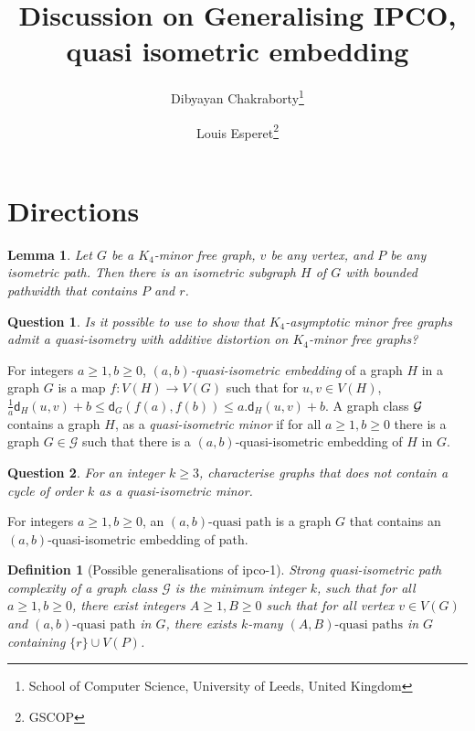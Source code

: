 \documentclass[a4paper]{article}
\title{Discussion on Generalising IPCO, quasi isometric embedding}
\author{Dibyayan Chakraborty\footnote{School of Computer Science, University of Leeds, United Kingdom}
 \and Louis Esperet\footnote{GSCOP}}
\date{}
\newcommand{\distG}[3]{\mathsf{d}_{#1}\left(#2,#3\right)}
\newtheorem{Question}{Question}
\newtheorem{lemma}{Lemma}
\newtheorem{definition}{Definition}
\begin{document}
\maketitle

\section{Directions}
 
 \newcommand{\quasipath}[2]{(#1,#2)\text{-quasi path}\xspace}
  \newcommand{\quasipaths}[2]{(#1,#2)\text{-quasi paths}\xspace}
  
 \begin{lemma}\label{lem:series-parallel}
 	Let $G$ be a $K_4$-minor free graph, $v$ be any vertex, and $P$ be any isometric path. Then there is an isometric subgraph $H$ of $G$ with bounded pathwidth that contains $P$ and $r$.
 \end{lemma}
 
 \begin{Question}
 	Is it possible to use  to show that $K_4$-asymptotic minor free graphs admit a quasi-isometry with additive distortion on $K_4$-minor free graphs?
 \end{Question}
 
 For integers $a\geq 1,b\geq 0$, \emph{$(a,b)$-quasi-isometric embedding} of a graph $H$ in a graph $G$ is a map $f\colon V(H)\rightarrow V(G)$ such that for  $u,v\in V(H)$, $\frac{1}{a}\distG{H}{u}{v}+b\leq \distG{G}{f(a)}{f(b)} \leq a.\distG{H}{u}{v}+b$.
 A graph class $\cal G$ contains a graph $H$, as a \emph{quasi-isometric minor} if for all $a\geq 1,b\geq 0$ there is a graph $G\in \mathcal{G}$ such that there is a  $(a,b)$-quasi-isometric embedding of $H$ in $G$. 
 
 \begin{Question}
 	For an integer $k\geq 3$, characterise graphs that does not contain a cycle of order $k$ as a quasi-isometric minor.
 \end{Question}
 
  For integers $a\geq 1,b\geq 0$, an $\quasipath{a}{b}$ is a graph $G$ that contains an $(a,b)$-quasi-isometric embedding of path. 
 
 \begin{definition}[Possible generalisations of ipco-1]\label{def:1}
 Strong quasi-isometric path complexity of a graph class $\mathcal{G}$ is the minimum integer $k$, such that for all $a\geq 1,b\geq 0$, there exist integers $A\geq 1,B\geq 0$ such that for all vertex $v\in V(G)$ and $\quasipath{a}{b}$ in $G$, there exists $k$-many $\quasipaths{A}{B}$ in $G$ containing $\{r\}\cup V(P)$. 
 \end{definition}
 
\end{document}
